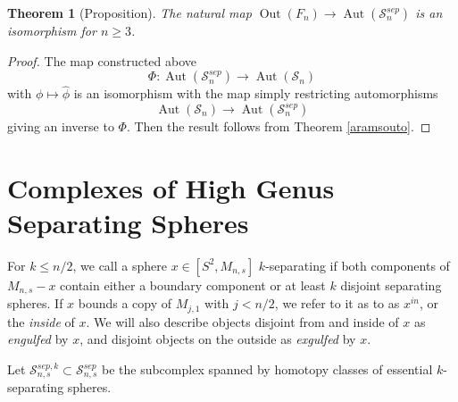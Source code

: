 \documentclass[11pt]{article}
\DeclareMathOperator{\oout}{Out}
\DeclareMathOperator{\aaut}{Aut}
\newtheorem{theorem}{Theorem}
\theoremstyle{remark}
\theoremstyle{definition}
\begin{document}
\begin{theorem}[Proposition]
  The natural map $\oout (F_n) \to \aaut \left ( \mathcal S^{sep}_n \right)$
  is an isomorphism for $n \geq 3$.
  \label{thm:sep}
\end{theorem}

\begin{proof}
The map constructed above
$$\Phi: \aaut \left ( \mathcal S^{sep}_n \right) \to \aaut \left ( \mathcal S_n \right)$$
with $\phi \mapsto \hat \phi$
is an isomorphism with the  map simply restricting automorphisms
$$\aaut \left ( \mathcal S_n \right) \to   \aaut \left ( \mathcal S^{sep}_n \right)$$
giving an inverse to $\Phi$.
Then the result follows from
Theorem \ref{aramsouto}.
\end{proof}

\section{Complexes of High Genus Separating Spheres}

For $k\leq n/2$, we call a sphere $x \in [S^2, M_{n,s}]$ $k$-separating
if both components of
$M_{n,s}-x$
contain either a boundary component
or at least $k$ disjoint separating spheres.
If $x$ bounds a copy of $M_{j,1}$ with $j<n/2$,
we refer to it as to as $x^{in}$, or the \emph{inside} of $x$.
We will also describe objects disjoint from and inside of $x$ as \emph{engulfed} by $x$,
and disjoint objects on the outside as \emph{exgulfed} by $x$.

Let $\mathcal S^{sep,k}_{n,s} \subset \mathcal S^{sep}_{n,s}$
be the subcomplex spanned by homotopy classes of essential $k$-separating
spheres.
\end{document}
